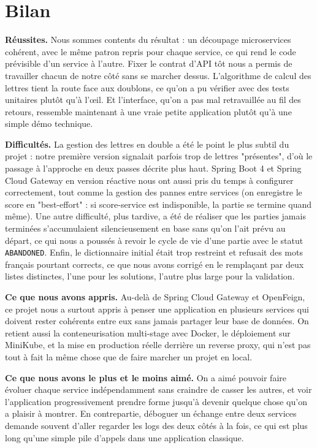 \documentclass[11pt,a4paper]{article}
\begin{document}
\section{Bilan}
\textbf{Réussites.} Nous sommes contents du résultat : un découpage microservices
cohérent, avec le même patron repris pour chaque service, ce qui rend le code
prévisible d'un service à l'autre. Fixer le contrat d'API tôt nous a permis de
travailler chacun de notre côté sans se marcher dessus. L'algorithme de calcul des
lettres tient la route face aux doublons, ce qu'on a pu vérifier avec des tests
unitaires plutôt qu'à l'\oe{}il. Et l'interface, qu'on a pas mal retravaillée au fil
des retours, ressemble maintenant à une vraie petite application plutôt qu'à une
simple démo technique.

\textbf{Difficultés.} La gestion des lettres en double a été le point le plus subtil
du projet : notre première version signalait parfois trop de lettres "présentes",
d'où le passage à l'approche en deux passes décrite plus haut. Spring Boot 4 et
Spring Cloud Gateway en version réactive nous ont aussi pris du temps à configurer
correctement, tout comme la gestion des pannes entre services (on enregistre le
score en "best-effort" : si score-service est indisponible, la partie se termine
quand même). Une autre difficulté, plus tardive, a été de réaliser que les parties
jamais terminées s'accumulaient silencieusement en base sans qu'on l'ait prévu au
départ, ce qui nous a poussés à revoir le cycle de vie d'une partie avec le statut
\texttt{ABANDONED}. Enfin, le dictionnaire initial était trop restreint et refusait
des mots français pourtant corrects, ce que nous avons corrigé en le remplaçant par
deux listes distinctes, l'une pour les solutions, l'autre plus large pour la
validation.

\textbf{Ce que nous avons appris.} Au-delà de Spring Cloud Gateway et OpenFeign, ce
projet nous a surtout appris à penser une application en plusieurs services qui
doivent rester cohérents entre eux sans jamais partager leur base de données. On
retient aussi la conteneurisation multi-stage avec Docker, le déploiement sur
MiniKube, et la mise en production réelle derrière un reverse proxy, qui n'est pas
tout à fait la même chose que de faire marcher un projet en local.

\textbf{Ce que nous avons le plus et le moins aimé.} On a aimé pouvoir faire évoluer
chaque service indépendamment sans craindre de casser les autres, et voir
l'application progressivement prendre forme jusqu'à devenir quelque chose qu'on a
plaisir à montrer. En contrepartie, déboguer un échange entre deux services demande
souvent d'aller regarder les logs des deux côtés à la fois, ce qui est plus long
qu'une simple pile d'appels dans une application classique.
\end{document}
